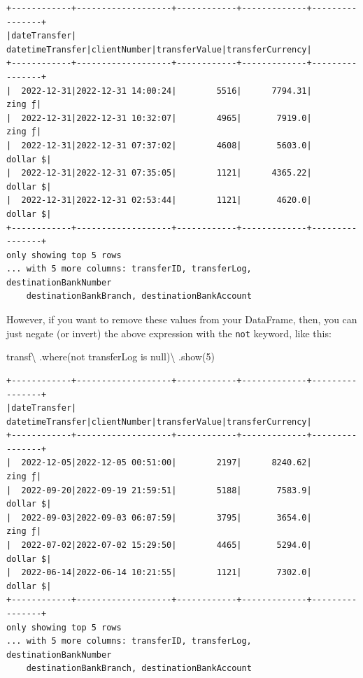 \documentclass[
  11pt,
  letterpaper,
  DIV=11,
  numbers=noendperiod]{scrreprt}
\newenvironment{Shaded}{\begin{snugshade}}{\end{snugshade}}
\newcommand{\DecValTok}[1]{\textcolor[rgb]{0.68,0.00,0.00}{#1}}
\newcommand{\NormalTok}[1]{\textcolor[rgb]{0.00,0.23,0.31}{#1}}
\newcommand{\OperatorTok}[1]{\textcolor[rgb]{0.37,0.37,0.37}{#1}}
\newcommand{\StringTok}[1]{\textcolor[rgb]{0.13,0.47,0.30}{#1}}
\begin{document}
\begin{verbatim}
+------------+-------------------+------------+-------------+----------------+
|dateTransfer|   datetimeTransfer|clientNumber|transferValue|transferCurrency|
+------------+-------------------+------------+-------------+----------------+
|  2022-12-31|2022-12-31 14:00:24|        5516|      7794.31|          zing ƒ|
|  2022-12-31|2022-12-31 10:32:07|        4965|       7919.0|          zing ƒ|
|  2022-12-31|2022-12-31 07:37:02|        4608|       5603.0|        dollar $|
|  2022-12-31|2022-12-31 07:35:05|        1121|      4365.22|        dollar $|
|  2022-12-31|2022-12-31 02:53:44|        1121|       4620.0|        dollar $|
+------------+-------------------+------------+-------------+----------------+
only showing top 5 rows
... with 5 more columns: transferID, transferLog, destinationBankNumber
    destinationBankBranch, destinationBankAccount
\end{verbatim}

However, if you want to remove these values from your DataFrame, then,
you can just negate (or invert) the above expression with the
\texttt{not} keyword, like this:

\begin{Shaded}
\begin{Highlighting}[]
\NormalTok{transf}\OperatorTok{\textbackslash{}}
\NormalTok{  .where(}\StringTok{\textquotesingle{}not transferLog is null\textquotesingle{}}\NormalTok{)}\OperatorTok{\textbackslash{}}
\NormalTok{  .show(}\DecValTok{5}\NormalTok{)}
\end{Highlighting}
\end{Shaded}

\begin{verbatim}
+------------+-------------------+------------+-------------+----------------+
|dateTransfer|   datetimeTransfer|clientNumber|transferValue|transferCurrency|
+------------+-------------------+------------+-------------+----------------+
|  2022-12-05|2022-12-05 00:51:00|        2197|      8240.62|          zing ƒ|
|  2022-09-20|2022-09-19 21:59:51|        5188|       7583.9|        dollar $|
|  2022-09-03|2022-09-03 06:07:59|        3795|       3654.0|          zing ƒ|
|  2022-07-02|2022-07-02 15:29:50|        4465|       5294.0|        dollar $|
|  2022-06-14|2022-06-14 10:21:55|        1121|       7302.0|        dollar $|
+------------+-------------------+------------+-------------+----------------+
only showing top 5 rows
... with 5 more columns: transferID, transferLog, destinationBankNumber
    destinationBankBranch, destinationBankAccount
\end{verbatim}
\end{document}

